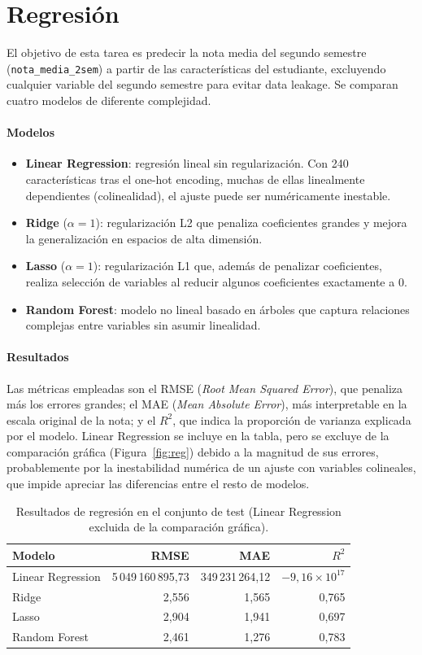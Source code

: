 \documentclass[11pt,letterpaper]{article}
\newcommand{\code}[1]{\texttt{#1}}
\begin{document}
\section{Regresión}

El objetivo de esta tarea es predecir la nota media del segundo semestre (\code{nota\_media\_2sem}) a partir de las características del estudiante, excluyendo cualquier variable del segundo semestre para evitar data leakage. Se comparan cuatro modelos de diferente complejidad.

\paragraph{Modelos}
\begin{itemize}
\item \textbf{Linear Regression}: regresión lineal sin regularización. Con 240 características tras el one-hot encoding, muchas de ellas linealmente dependientes (colinealidad), el ajuste puede ser numéricamente inestable.
\item \textbf{Ridge} ($\alpha=1$): regularización L2 que penaliza coeficientes grandes y mejora la generalización en espacios de alta dimensión.
\item \textbf{Lasso} ($\alpha=1$): regularización L1 que, además de penalizar coeficientes, realiza selección de variables al reducir algunos coeficientes exactamente a 0.
\item \textbf{Random Forest}: modelo no lineal basado en árboles que captura relaciones complejas entre variables sin asumir linealidad.
\end{itemize}

\paragraph{Resultados}
Las métricas empleadas son el RMSE (\emph{Root Mean Squared Error}), que penaliza más los errores grandes; el MAE (\emph{Mean Absolute Error}), más interpretable en la escala original de la nota; y el $R^2$, que indica la proporción de varianza explicada por el modelo. Linear Regression se incluye en la tabla, pero se excluye de la comparación gráfica (Figura~\ref{fig:reg}) debido a la magnitud de sus errores, probablemente por la inestabilidad numérica de un ajuste con variables colineales, que impide apreciar las diferencias entre el resto de modelos.

\begin{table}[H]
\centering
\caption{Resultados de regresión en el conjunto de test (Linear Regression excluida de la comparación gráfica).}
\begin{tabular}{lrrr}
\toprule
Modelo & RMSE & MAE & $R^2$\\
\midrule
Linear Regression & 5\,049\,160\,895,73 & 349\,231\,264,12 & $-9{,}16\times10^{17}$\\
Ridge & 2,556 & 1,565 & 0,765\\
Lasso & 2,904 & 1,941 & 0,697\\
Random Forest & 2,461 & 1,276 & 0,783\\
\bottomrule
\end{tabular}
\end{table}
\end{document}
